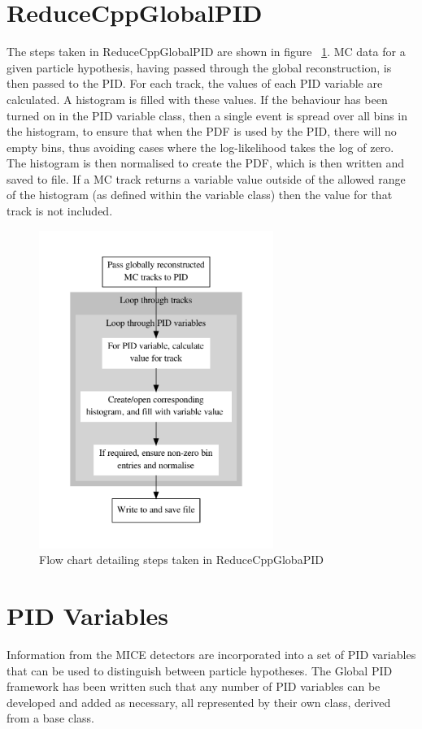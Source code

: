 \section{ReduceCppGlobalPID}
\label{reducer}
The steps taken in ReduceCppGlobalPID are shown in figure ~\ref{reduceflow}. MC data for a given particle hypothesis, having passed through the global reconstruction, is then passed to the PID. For each track, the values of each PID variable are calculated. A histogram is filled with these values. If the behaviour has been turned on in the PID variable class, then a single event is spread over all bins in the histogram, to ensure that when the PDF is used by the PID, there will no empty bins, thus avoiding cases where the log-likelihood takes the log of zero. The histogram is then normalised to create the PDF, which is then written and saved to file.
If a MC track returns a variable value outside of the allowed range of the histogram (as defined within the variable class) then the value for that track is not included.
\begin{figure}[h!]
\begin{center} 
\includegraphics[width=3in]{reconstruction/globalpid/PDFflow.pdf} 
\caption{Flow chart detailing steps taken in ReduceCppGlobaPID}
\label{reduceflow}
\end{center} 
\end{figure}

\section{PID Variables}
\label{PID}
Information from the MICE detectors are incorporated into a set of 
PID variables that can be used to distinguish between particle 
hypotheses.
The Global PID framework has been written such that any number of PID 
variables can be developed and added as necessary, all represented by 
their own class, derived from a base class.

